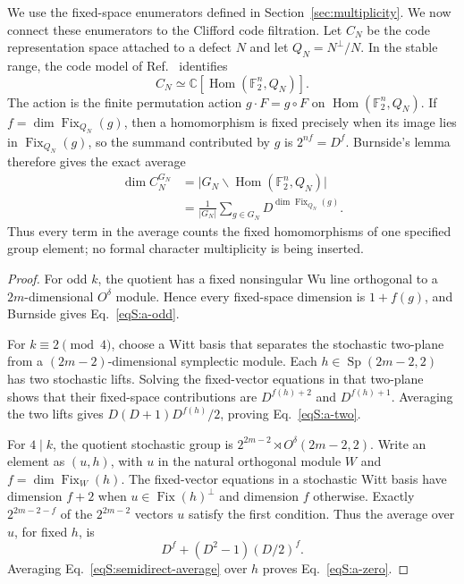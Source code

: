 \documentclass[journal,twocolumn]{IEEEtran}
\theoremstyle{definition}
\theoremstyle{plain}
\newcommand{\F}{\mathbb F}
\newcommand{\Fix}{\operatorname{Fix}}
\newcommand{\Sp}{\operatorname{Sp}}
\begin{document}
We use the fixed-space enumerators defined in
Section~\ref{sec:multiplicity}.
We now connect these enumerators to the Clifford code filtration.  Let $C_N$
be the code representation space attached to a defect $N$ and let
$Q_N=N^\perp/N$.  In the stable range, the code model of
Ref.~\cite{MontealegreGross2025} identifies
\begin{equation}
 C_N\simeq\mathbb C[\operatorname{Hom}(\F_2^n,Q_N)].
 \label{eqS:code-model}
\end{equation}
The action is the finite permutation action
$g\cdot F=g\circ F$ on $\operatorname{Hom}(\F_2^n,Q_N)$.  If
$f=\dim\Fix_{Q_N}(g)$, then a homomorphism is fixed precisely when its image
lies in $\Fix_{Q_N}(g)$, so the summand contributed by $g$ is
$2^{nf}=D^f$.  Burnside's lemma therefore gives the exact average
\begin{equation}
 \begin{aligned}
 \dim C_N^{G_N}
 &=\bigl|G_N\backslash\operatorname{Hom}(\F_2^n,Q_N)\bigr|\\
 &=\frac1{|G_N|}\sum_{g\in G_N}D^{\dim\Fix_{Q_N}(g)}.
 \end{aligned}
 \label{eqS:Burnside-code}
\end{equation}
Thus every term in the average counts the fixed homomorphisms of one
specified group element; no formal character multiplicity is being inserted.

\begin{proof}
For odd $k$, the quotient has a fixed nonsingular Wu line orthogonal to a
$2m$-dimensional $O^\delta$ module.  Hence every fixed-space dimension is
$1+f(g)$, and Burnside gives Eq.~\eqref{eqS:a-odd}.

For $k\equiv2\pmod4$, choose a Witt basis that separates the stochastic
two-plane from a $(2m-2)$-dimensional symplectic module.  Each
$h\in\Sp(2m-2,2)$ has two stochastic lifts.  Solving the fixed-vector
equations in that two-plane shows that their fixed-space contributions are
$D^{f(h)+2}$ and $D^{f(h)+1}$.  Averaging the two lifts gives
$D(D+1)D^{f(h)}/2$, proving Eq.~\eqref{eqS:a-two}.

For $4\mid k$, the quotient stochastic group is
$2^{2m-2}\rtimes O^\delta(2m-2,2)$.  Write an element as $(u,h)$, with
$u$ in the natural orthogonal module $W$ and
$f=\dim\Fix_W(h)$.  The fixed-vector equations in a stochastic Witt basis
have dimension $f+2$ when $u\in\Fix(h)^\perp$ and dimension $f$ otherwise.
Exactly $2^{2m-2-f}$ of the $2^{2m-2}$ vectors $u$ satisfy the first
condition.  Thus the average over $u$, for fixed $h$, is
\begin{equation}
 D^f+(D^2-1)(D/2)^f.
 \label{eqS:semidirect-average}
\end{equation}
Averaging Eq.~\eqref{eqS:semidirect-average} over $h$ proves
Eq.~\eqref{eqS:a-zero}.
\end{proof}
\end{document}
